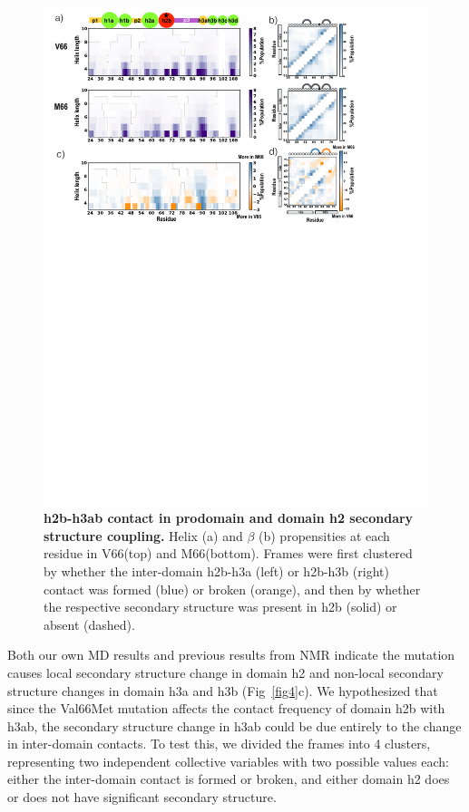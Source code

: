 \documentclass[journal=jacsat,manuscript=article]{achemso}
\begin{document}
\begin{figure}[!ht]
\includegraphics[scale=0.5,width=\textwidth,trim={0 0cm 0 0cm},clip]{../figures/fig5.pdf}
\caption{{\bf h2b-h3ab contact in prodomain and domain h2 secondary structure coupling.} Helix (a) and $\beta$ (b) propensities at each residue in V66(top) and M66(bottom). Frames were first clustered by whether the inter-domain h2b-h3a (left) or h2b-h3b (right) contact was formed (blue) or broken (orange), and then by whether the respective secondary structure was present in h2b (solid) or absent (dashed). 
 }
\label{fig5}
\end{figure}

Both our own MD results and previous results from NMR indicate the mutation causes local secondary structure change in domain h2 and non-local secondary structure changes in domain h3a and h3b (Fig~\ref{fig4}c). We hypothesized that since the Val66Met mutation affects the contact frequency of domain h2b with h3ab, the secondary structure change in h3ab could be due entirely to the change in inter-domain contacts. To test this, we divided the frames into 4 clusters, representing two independent collective variables with two possible values each: either the inter-domain contact is formed or broken, and either domain h2 does or does not have significant secondary structure.
\end{document}
